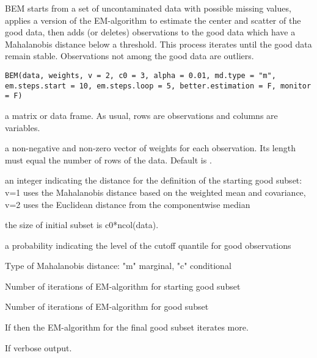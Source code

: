 %
\begin{Description}\relax
BEM starts from a set of uncontaminated data with possible missing values, applies a version of the EM-algorithm
to estimate the center and scatter of the good data, then adds (or deletes) observations to the good data which have	 
a Mahalanobis distance below a threshold. This process iterates until the good data remain stable. Observations not 
among the good data are outliers.
\end{Description}
%
\begin{Usage}
\begin{verbatim}
BEM(data, weights, v = 2, c0 = 3, alpha = 0.01, md.type = "m", em.steps.start = 10, em.steps.loop = 5, better.estimation = F, monitor = F)
\end{verbatim}
\end{Usage}
%
\begin{Arguments}
\begin{ldescription}
\item[\code{data}] a matrix or data frame. As usual, rows are observations and columns are variables.
\item[\code{weights}] a non-negative and non-zero vector of weights for each observation. 
Its length must equal the number of rows of the data. Default is .
\item[\code{v}] an integer indicating the distance for the definition of the starting good subset: v=1 uses the Mahalanobis distance based 
on the weighted mean and covariance, v=2 uses the Euclidean distance from the componentwise median
\item[\code{c0}] the size of initial subset is c0*ncol(data).
\item[\code{alpha}] a probability indicating the level  of the cutoff quantile for good observations
\item[\code{md.type}] Type of Mahalanobis distance: "m" marginal, "c" conditional
\item[\code{em.steps.start}] Number of iterations of EM-algorithm for starting good subset
\item[\code{em.steps.loop}] Number of iterations of EM-algorithm for good subset
\item[\code{better.estimation}] If  then the EM-algorithm 
for the final good subset iterates  more.
\item[\code{monitor}] If  verbose output.
\end{ldescription}
\end{Arguments}

